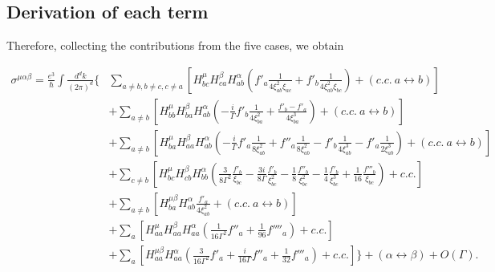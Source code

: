 \documentclass[twocolumn,superscriptaddress]{revtex4-1}
\begin{document}
\subsection{Derivation of each term}
Therefore, collecting the contributions from the five cases, we obtain
\begin{widetext}
\begin{align}
  \sigma^{\mu\alpha\beta}=\frac{e^3}{\hbar}\int \frac{d^d k}{(2\pi)^d}\Bigg\{&\sum_{a\neq b,b\neq c,c\neq a}\left[H_{bc}^\mu H_{ca}^\beta H_{ab}^\alpha \left(f'_a\frac{1}{4\xi_{ab}^2\xi_{ac}}+f'_b\frac{1}{4\xi_{ab}^2\xi_{bc}} \right)+(c.c.\ a\leftrightarrow b)\right] \nonumber\\
  &+\sum_{a\neq b}\left[H_{bb}^\mu H_{ba}^\beta H_{ab}^\alpha \left(-\frac{i}{\Gamma}f'_b\frac{1}{4\xi_{ba}^2}+\frac{f'_b-f'_a}{4\xi_{ba}^3}\right)+(c.c.\ a\leftrightarrow b)\right] \nonumber\\
  &+\sum_{a\neq b}\left[H_{ba}^\mu H_{aa}^\beta H_{ab}^\alpha \left(-\frac{i}{\Gamma}f'_a\frac{1}{8\xi_{ab}^2}+f''_a\frac{1}{8\xi_{ab}^2}-f'_b\frac{1}{4\xi_{ab}^3}-f'_a\frac{1}{2\xi_{ab}^3}\right)+(c.c.\ a\leftrightarrow b)\right] \nonumber\\
  &+\sum_{c\neq b}\left[H_{bc}^\mu H_{cb}^\beta H_{bb}^\alpha \left(\frac{3}{8\Gamma^2}\frac{f'_b}{\xi_{bc}}-\frac{3i}{8\Gamma}\frac{f'_b}{\xi_{bc}^2}-\frac{1}{8}\frac{f''_b}{\xi_{bc}^2}-\frac{1}{4}\frac{f'_b}{\xi_{bc}^3}+\frac{1}{16}\frac{f'''_b}{\xi_{bc}}\right)+c.c.\right]\nonumber\\
  &+\sum_{a\neq b}\left[H_{ba}^{\mu\beta} H_{ab}^\alpha \frac{f'_a}{4\xi_{ab}^2}+(c.c.\ a\leftrightarrow b)\right] \nonumber\\
  &+\sum_a\left[H_{aa}^\mu H_{aa}^\beta H_{aa}^\alpha \left(\frac{1}{16\Gamma^2}f''_a+\frac{1}{96}f''''_a\right)+c.c.\right]\nonumber \\
  &+\sum_a\left[H_{aa}^{\mu\beta} H_{aa}^\alpha \left(\frac{3}{16\Gamma^2}f'_a+\frac{i}{16\Gamma}f''_a+\frac{1}{32}f'''_a\right)+c.c.\right]\Bigg\}+(\alpha \leftrightarrow \beta)+O(\Gamma). \label{eq:nonlinearConductivityUptoTau0}
\end{align}
\end{widetext}
\end{document}
